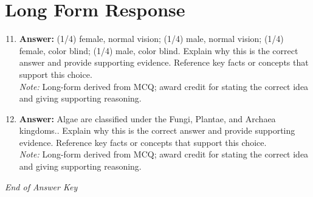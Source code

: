 \documentclass[12pt]{article}
\begin{document}
\section*{Long Form Response}
\begin{enumerate}[label=\arabic*.]
\setcounter{enumi}{10}
\item \textbf{Answer:} (1/4) female, normal vision; (1/4) male, normal vision; (1/4) female, color blind; (1/4) male, color blind. Explain why this is the correct answer and provide supporting evidence. Reference key facts or concepts that support this choice.
\\ \textit{Note:} Long-form derived from MCQ; award credit for stating the correct idea and giving supporting reasoning.
\item \textbf{Answer:} Algae are classified under the Fungi, Plantae, and Archaea kingdoms.. Explain why this is the correct answer and provide supporting evidence. Reference key facts or concepts that support this choice.
\\ \textit{Note:} Long-form derived from MCQ; award credit for stating the correct idea and giving supporting reasoning.
\end{enumerate}

\vfill
\noindent\textit{End of Answer Key}
\end{document}
